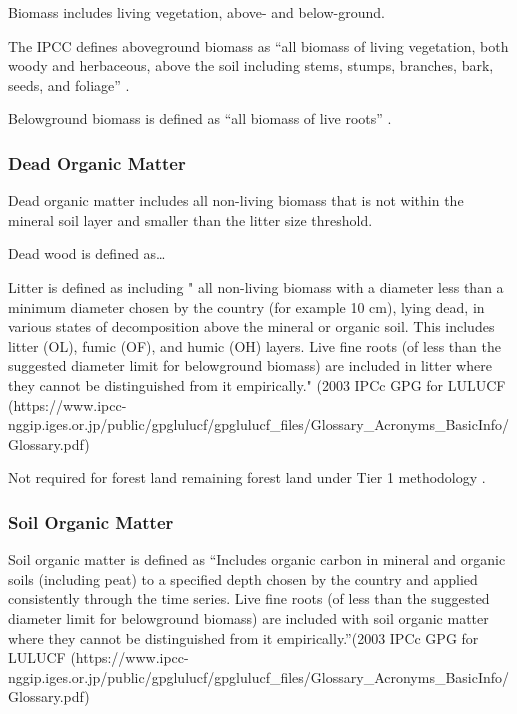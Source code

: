 \documentclass[, manuscript]{copernicus}
\begin{document}
Biomass includes living vegetation, above- and below-ground.

The IPCC defines aboveground biomass as ``all biomass of living
vegetation, both woody and herbaceous, above the soil including stems,
stumps, branches, bark, seeds, and foliage'' \citep{ipcc_2006_2006}.

Belowground biomass is defined as ``all biomass of live roots''
\citep{ipcc_2006_2006}.

\subsubsection{Dead Organic Matter}

Dead organic matter includes all non-living biomass that is not within
the mineral soil layer and smaller than the litter size threshold.

Dead wood is defined as\ldots{}

Litter is defined as including " all non-living biomass with a diameter
less than a minimum diameter chosen by the country (for example 10 cm),
lying dead, in various states of decomposition above the mineral or
organic soil. This includes litter (OL), fumic (OF), and humic (OH)
layers. Live fine roots (of less than the suggested diameter limit for
belowground biomass) are included in litter where they cannot be
distinguished from it empirically." (2003 IPCc GPG for LULUCF
(https://www.ipcc-nggip.iges.or.jp/public/gpglulucf/gpglulucf\_files/Glossary\_Acronyms\_BasicInfo/Glossary.pdf)

Not required for forest land remaining forest land under Tier 1
methodology \citep{ipcc_2006_2006}.

\subsubsection{Soil Organic Matter}

Soil organic matter is defined as ``Includes organic carbon in mineral
and organic soils (including peat) to a specified depth chosen by the
country and applied consistently through the time series. Live fine
roots (of less than the suggested diameter limit for belowground
biomass) are included with soil organic matter where they cannot be
distinguished from it empirically.''(2003 IPCc GPG for LULUCF
(https://www.ipcc-nggip.iges.or.jp/public/gpglulucf/gpglulucf\_files/Glossary\_Acronyms\_BasicInfo/Glossary.pdf)
\end{document}
